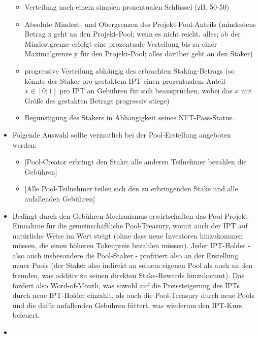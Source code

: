 \begin{itemize}
	\begin{itemize}
		\item Verteilung nach einem simplen prozentualen Schlüssel (zB. 50-50)
		\item Absolute Mindest- und Obergrenzen des Projekt-Pool-Anteils (mindestens Betrag x geht an den Projekt-Pool; wenn es nicht reicht, alles; ab der Mindestgrenze erfolgt eine prozentuale Verteilung bis zu einer Maximalgrenze y für den Projekt-Pool; alles darüber geht an den Staker)
		\item progressive Verteilung abhängig des erbrachten Staking-Betrags (so könnte der Staker pro gestaktem IPT einen prozentualem Anteil $x \in [0; 1]$ pro IPT an Gebühren für sich beanspruchen, wobei das $x$ mit Größe des gestakten Betrags progressiv stiege)
		 \item Begünstigung des Stakers in Abhängigkeit seines NFT-Pass-Status.
	\end{itemize}
	\item Folgende Auswahl sollte vermutlich bei der Pool-Erstellung angeboten werden:
	\begin{itemize}
		\item $[$Pool-Creator erbringt den Stake; alle anderen Teilnehmer bezahlen die Gebühren$]$
		\item $[$Alle Pool-Teilnehmer teilen sich den zu erbringenden Stake und alle anfallenden Gebühren$]$
	\end{itemize} 
	\item Bedingt durch den Gebühren-Mechanismus erwirtschaften das Pool-Projekt Einnahme für die gemeinschaftliche Pool-Treasury, womit auch der IPT auf natürliche Weise im Wert steigt (ohne dass neue Investoren hinzukommen müssen, die einen höheren Tokenpreis bezahlen müssen). Jeder IPT-Holder - also auch insbesondere die Pool-Staker - profitiert also an der Erstellung neuer Pools (der Staker also indirekt an seinem eigenen Pool als auch an den fremden, was additiv zu seinen direkten Stake-Rewards hinzukommt). Das fördert also Word-of-Mouth, was sowohl auf die Preissteigerung des IPTs durch neue IPT-Holder einzahlt, als auch die Pool-Treasury durch neue Pools und die dafür anfallenden Gebühren füttert, was wiederum den IPT-Kurs befeuert.
	\item
\end{itemize}

\vspace{0.5cm}
